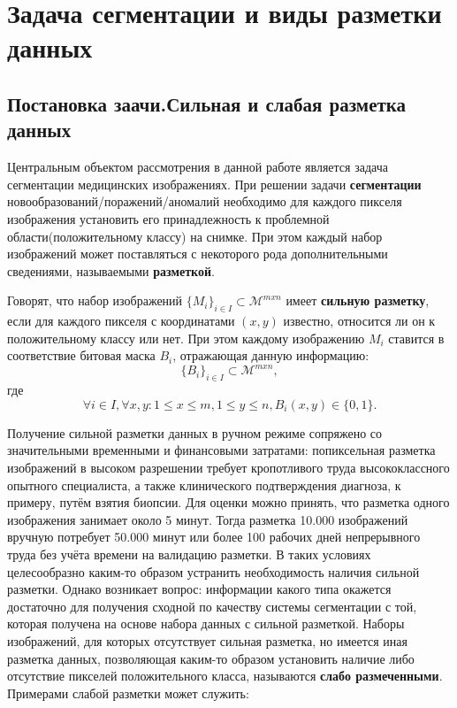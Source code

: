 \chapter{Задача сегментации и виды разметки данных} \label{chapt1}


\section{Постановка заачи.Сильная и слабая разметка данных}
Центральным объектом рассмотрения в данной работе является задача сегментации медицинских изображениях.
При решении задачи {\bf сегментации}  новообразований/поражений/аномалий необходимо для каждого пикселя изображения установить его принадлежность к проблемной области(положительному классу) на снимке. При этом каждый набор изображений может поставляться с некоторого рода дополнительными сведениями, называемыми {\bf разметкой}.

Говорят, что набор изображений $\{M_i\}_{i\in I}\subset \mathcal{M}^{mxn}$ имеет {\bf сильную разметку}, если для каждого пикселя с координатами $(x,y)$ известно, относится ли он к положительному классу или нет. При этом каждому изображению $M_i$ ставится в соответствие битовая маска $B_i$, отражающая данную информацию: $$\{B_i\}_{i\in I} \subset \mathcal{M}^{mxn},$$ где $$\forall i \in I,  \forall x,y: 1\le x \le m, 1\le y \le n, B_i(x,y) \in \{0,1\}.$$

Получение сильной разметки данных в ручном режиме сопряжено со значительными временными и финансовыми затратами: попиксельная разметка изображений в высоком разрешении требует кропотливого труда высококлассного опытного специалиста, а также клинического подтверждения диагноза, к примеру, путём взятия биопсии. Для оценки можно принять, что разметка одного изображения занимает около 5 минут. Тогда разметка 10.000 изображений вручную потребует 50.000 минут или более 100 рабочих дней непрерывного труда без учёта времени на валидацию разметки. В таких условиях целесообразно каким-то образом устранить необходимость наличия сильной разметки. Однако возникает вопрос: информации какого типа окажется достаточно для получения сходной по качеству системы сегментации с той, которая получена на основе набора данных с сильной разметкой. Наборы изображений, для которых отсутствует сильная разметка, но имеется иная разметка данных, позволяющая каким-то образом установить наличие либо отсутствие пикселей положительного класса, называются {\bf слабо размеченными}. Примерами слабой разметки может служить:

